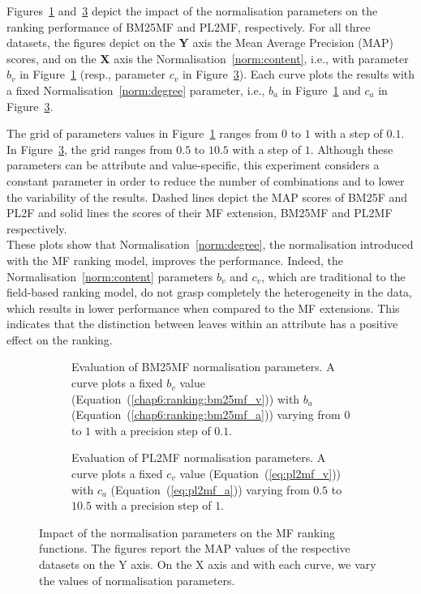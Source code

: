 Figures~\ref{fig:bm25mf-norm} and~\ref{fig:pl2mf-norm} depict the impact of the normalisation parameters on the ranking performance of \gls{BM25MF} and \gls{PL2MF}, respectively. For all three datasets, the figures depict on the \textbf{Y} axis the Mean Average Precision (MAP) scores, and on the \textbf{X} axis the Normalisation~\ref{norm:content}, i.e., with parameter $b_v$ in Figure~\ref{fig:bm25mf-norm} (resp., parameter $c_v$ in Figure~\ref{fig:pl2mf-norm}). Each curve plots the results with a fixed Normalisation~\ref{norm:degree} parameter, i.e., $b_a$ in Figure~\ref{fig:bm25mf-norm} and $c_a$ in Figure~\ref{fig:pl2mf-norm}.

The grid of parameters values in Figure~\ref{fig:bm25mf-norm} ranges from $0$ to $1$ with a step of $0.1$. In Figure~\ref{fig:pl2mf-norm}, the grid ranges from $0.5$ to $10.5$ with a step of $1$. Although these parameters can be attribute and value-specific, this experiment considers a constant parameter in order to reduce the number of combinations and to lower the variability of the results. Dashed lines depict the MAP scores of BM25F and PL2F and solid lines the scores of their \gls{MF} extension, \gls{BM25MF} and \gls{PL2MF} respectively.\\

These plots show that Normalisation~\ref{norm:degree}, the normalisation introduced with the \gls{MF} ranking model, improves the performance. Indeed, the Normalisation~\ref{norm:content} parameters $b_v$ and $c_v$, which are traditional to the field-based ranking model, do not grasp completely the heterogeneity in the data, which results in lower performance when compared to the \gls{MF} extensions. This indicates that the distinction between leaves within an attribute has a positive effect on the ranking.

\begin{figure}
	\centering
	\begin{subfigure}{\textwidth}
		\centering
		
		\addtocounter{subfigure}{-1}
		\caption{Evaluation of BM25MF normalisation parameters. A curve plots a fixed $b_v$ value (Equation~(\ref{chap6:ranking:bm25mf_v})) with $b_a$ (Equation~(\ref{chap6:ranking:bm25mf_a})) varying from $0$ to $1$ with a precision step of $0.1$.}
		\label{fig:bm25mf-norm}
	\end{subfigure}
	\qquad
	\begin{subfigure}{\textwidth}
		\centering
		
		\addtocounter{subfigure}{-1}
		\caption{Evaluation of PL2MF normalisation parameters. A curve plots a fixed $c_v$ value (Equation~(\ref{eq:pl2mf_v})) with $c_a$ (Equation~(\ref{eq:pl2mf_a})) varying from $0.5$ to $10.5$ with a precision step of $1$.}
		\label{fig:pl2mf-norm}
	\end{subfigure}
	\caption[Impact of the normalisation parameters on the MF ranking functions]{Impact of the normalisation parameters on the \gls{MF} ranking functions. The figures report the MAP values of the respective datasets on the Y axis. On the X axis and with each curve, we vary the values of normalisation parameters.}
\end{figure}

